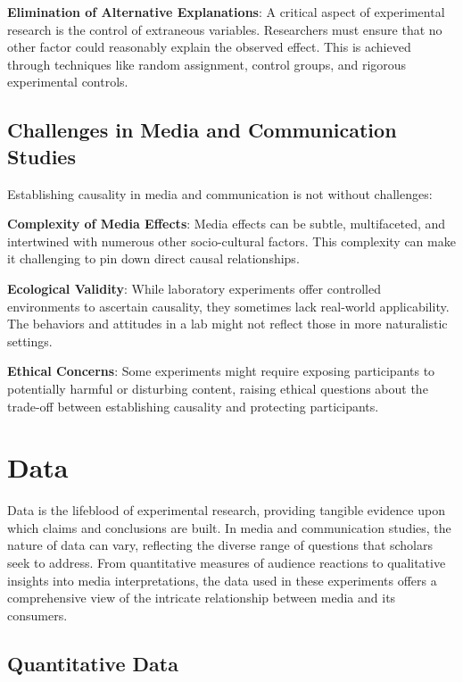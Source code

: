 \documentclass[
  b5paper]{book}
\begin{document}
\textbf{Elimination of Alternative Explanations}: A critical aspect of experimental research is the control of extraneous variables. Researchers must ensure that no other factor could reasonably explain the observed effect. This is achieved through techniques like random assignment, control groups, and rigorous experimental controls.

\hypertarget{challenges-in-media-and-communication-studies}{%
\subsection*{Challenges in Media and Communication Studies}\label{challenges-in-media-and-communication-studies}}

Establishing causality in media and communication is not without challenges:

\textbf{Complexity of Media Effects}: Media effects can be subtle, multifaceted, and intertwined with numerous other socio-cultural factors. This complexity can make it challenging to pin down direct causal relationships.

\textbf{Ecological Validity}: While laboratory experiments offer controlled environments to ascertain causality, they sometimes lack real-world applicability. The behaviors and attitudes in a lab might not reflect those in more naturalistic settings.

\textbf{Ethical Concerns}: Some experiments might require exposing participants to potentially harmful or disturbing content, raising ethical questions about the trade-off between establishing causality and protecting participants.

\hypertarget{data}{%
\section{Data}\label{data}}

Data is the lifeblood of experimental research, providing tangible evidence upon which claims and conclusions are built. In media and communication studies, the nature of data can vary, reflecting the diverse range of questions that scholars seek to address. From quantitative measures of audience reactions to qualitative insights into media interpretations, the data used in these experiments offers a comprehensive view of the intricate relationship between media and its consumers.

\hypertarget{quantitative-data}{%
\subsection*{Quantitative Data}\label{quantitative-data}}
\end{document}
